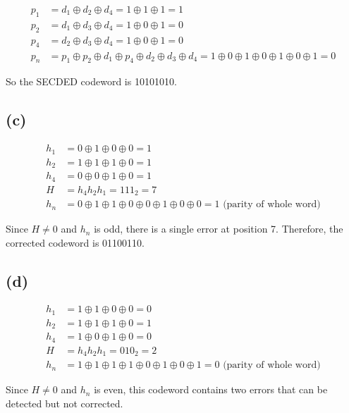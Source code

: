 \documentclass[12pt]{article}
\begin{document}
\begin{align*}
    p_1 &= d_1 \oplus d_2 \oplus d_4 = 1 \oplus 1 \oplus 1 = 1 \\
    p_2 &= d_1 \oplus d_3 \oplus d_4 = 1 \oplus 0 \oplus 1 = 0 \\
    p_4 &= d_2 \oplus d_3 \oplus d_4 = 1 \oplus 0 \oplus 1 = 0 \\
    p_n &= p_1 \oplus p_2 \oplus d_1 \oplus p_4 \oplus d_2 \oplus d_3 \oplus d_4 = 1 \oplus 0 \oplus 1 \oplus 0 \oplus 1 \oplus 0 \oplus 1 = 0
\end{align*}

So the SECDED codeword is 10101010.

\subsection*{(c)}

\begin{align*}
    h_1 &= 0 \oplus 1 \oplus 0 \oplus 0 = 1 \\
    h_2 &= 1 \oplus 1 \oplus 1 \oplus 0 = 1 \\
    h_4 &= 0 \oplus 0 \oplus 1 \oplus 0 = 1 \\
    H &= h_4h_2h_1 = 111_{2} = 7 \\
    h_n &= 0 \oplus 1 \oplus 1 \oplus 0 \oplus 0 \oplus 1 \oplus 0 \oplus 0 = 1 \text{ (parity of whole word)}
\end{align*}

Since $H \neq 0$ and $h_n$ is odd, there is a single error at position 7. Therefore, the corrected codeword is 01100110.

\subsection*{(d)}

\begin{align*}
    h_1 &= 1 \oplus 1 \oplus 0 \oplus 0 = 0 \\
    h_2 &= 1 \oplus 1 \oplus 1 \oplus 0 = 1 \\
    h_4 &= 1 \oplus 0 \oplus 1 \oplus 0 = 0 \\
    H &= h_4h_2h_1 = 010_{2} = 2 \\
    h_n &= 1 \oplus 1 \oplus 1 \oplus 1 \oplus 0 \oplus 1 \oplus 0 \oplus 1 = 0 \text{ (parity of whole word)}
\end{align*}

Since $H \neq 0$ and $h_n$ is even, this codeword contains two errors that can be detected but not corrected.
\end{document}
